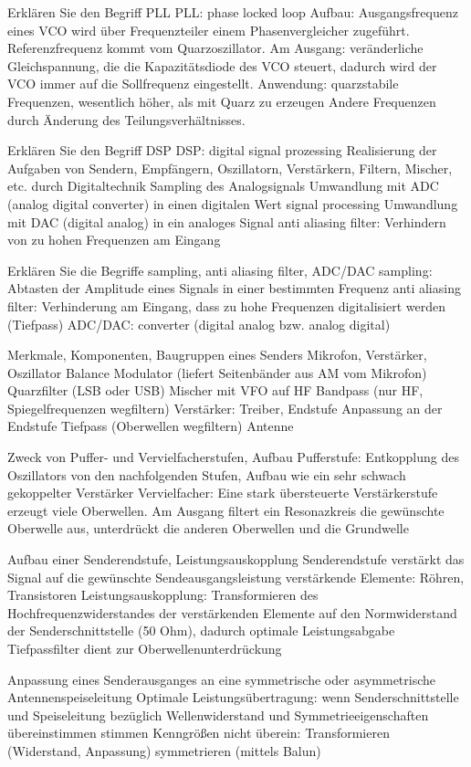 \documentclass[avery5371,grid,frame,a4paper]{flashcards}
\newcommand{\card}[3]{
  \begin{flashcard}[{\chap} -- #1]{#2}#3\end{flashcard}
}
\begin{document}
\card{54}{Erklären Sie den Begriff PLL}{
  PLL: phase locked loop
Aufbau: Ausgangsfrequenz eines VCO wird über Frequenzteiler
einem Phasenvergleicher zugeführt. Referenzfrequenz kommt 
vom Quarzoszillator.
Am Ausgang: veränderliche Gleichspannung, die die 
Kapazitätsdiode des VCO steuert, dadurch wird der VCO immer
auf die Sollfrequenz eingestellt.
Anwendung: quarzstabile Frequenzen, wesentlich höher, als mit
Quarz zu erzeugen
Andere Frequenzen durch Änderung des Teilungsverhältnisses.
}
\card{55}{Erklären Sie den Begriff DSP}{
  DSP: digital signal prozessing
Realisierung der Aufgaben von Sendern, Empfängern, 
Oszillatorn, Verstärkern, Filtern, Mischer, etc. durch
Digitaltechnik
Sampling des Analogsignals
Umwandlung mit ADC (analog digital converter) in 
einen digitalen Wert
signal processing
Umwandlung mit DAC (digital analog) in ein analoges
Signal
anti aliasing filter: Verhindern von zu hohen 
Frequenzen am Eingang
}
\card{56}{Erklären Sie die Begriffe sampling, anti aliasing filter, ADC/DAC}{
  sampling: Abtasten der Amplitude eines Signals
in einer bestimmten Frequenz
anti aliasing filter: Verhinderung am Eingang, dass
zu hohe Frequenzen digitalisiert werden (Tiefpass)
ADC/DAC: converter (digital analog bzw. analog digital)
}
\card{57}{Merkmale, Komponenten, Baugruppen eines Senders}{
  Mikrofon, Verstärker, Oszillator
Balance Modulator (liefert Seitenbänder aus AM vom Mikrofon)
Quarzfilter (LSB oder USB)
Mischer mit VFO auf HF
Bandpass (nur HF, Spiegelfrequenzen wegfiltern)
Verstärker: Treiber, Endstufe
Anpassung an der Endstufe
Tiefpass (Oberwellen wegfiltern)
Antenne
}
\card{58}{Zweck von Puffer- und Vervielfacherstufen, Aufbau}{
  Pufferstufe: Entkopplung des Oszillators von den 
nachfolgenden Stufen, Aufbau wie ein sehr schwach
gekoppelter Verstärker
Vervielfacher: Eine stark übersteuerte Verstärkerstufe
erzeugt viele Oberwellen. Am Ausgang filtert ein 
Resonazkreis die gewünschte Oberwelle aus, 
unterdrückt die anderen Oberwellen und die Grundwelle
}
\card{59}{Aufbau einer Senderendstufe, Leistungsauskopplung}{
  Senderendstufe verstärkt das Signal auf die
gewünschte Sendeausgangsleistung
verstärkende Elemente: Röhren, Transistoren
Leistungsauskopplung: Transformieren des 
Hochfrequenzwiderstandes der verstärkenden 
Elemente auf den Normwiderstand der 
Senderschnittstelle (50 Ohm), dadurch optimale
Leistungsabgabe
Tiefpassfilter dient zur Oberwellenunterdrückung
}
\card{60}{Anpassung eines Senderausganges an eine symmetrische oder asymmetrische Antennenspeiseleitung}{
  Optimale Leistungsübertragung: wenn 
Senderschnittstelle und Speiseleitung bezüglich
Wellenwiderstand und 
Symmetrieeigenschaften übereinstimmen 
stimmen Kenngrößen nicht überein: 
Transformieren (Widerstand, Anpassung) 
symmetrieren (mittels Balun)
}
\end{document}
